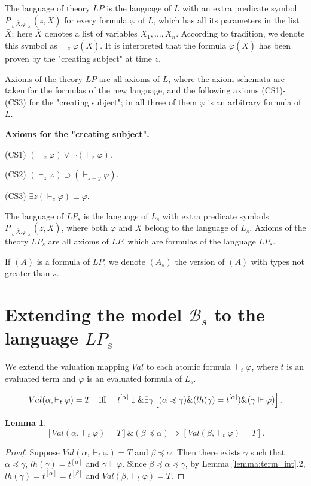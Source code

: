 \documentclass{asl}
\newtheorem{lemma}{Lemma}[section]
\theoremstyle{definition}
\begin{document}
The language of theory $ LP $ is the language of $ L $ with an extra predicate symbol $ P_{\llcorner \bar{X}.\varphi \lrcorner} (z,\bar{X})$ for every formula $ \varphi $ of $ L $, which has all its parameters in the list $ \bar{X} $; here $ \bar{X} $ denotes a list of variables $ X_1,\ldots,X_n $. According to tradition, we denote this symbol as $ \vdash_z \varphi(\bar{X}) $. It is interpreted that the formula $ \varphi(\bar{X}) $ has been proven by the "creating subject" at time $z$.

Axioms of the theory $ LP $ are all axioms of $ L $, where the axiom schemata are taken for the formulas of the new language, and the following axioms (CS1)-(CS3) for the "creating subject"; in all three of them $ \varphi $ is an arbitrary formula of $L$.
\medskip

\begin{center}
\textbf{Axioms for the "creating subject".} 
\end{center}


(CS1) $(\vdash_z \varphi)\vee \neg (\vdash_z \varphi)$. 
\medskip

(CS2) $(\vdash_z \varphi)\supset (\vdash_{z+y} \varphi)$. 
\medskip

(CS3) $\exists z (\vdash_z \varphi)\equiv \varphi $.
\medskip

The language of $ LP_s $ is the language of $ L_s $ with extra predicate symbols $P_{\llcorner \bar{X}.\varphi \lrcorner} (z,\bar{X})$, where both $ \varphi $ and $ \bar{X}$ belong to the language of $ L_s $. Axioms of the theory $ LP_s $ are all axioms of $ LP $, which are formulas of the language $ LP_s $.

If $(A)$ is a formula of $LP$, we denote $(A_s)$ the version of $(A)$ with types not greater than $s$.

\section{Extending the model $\mathcal{B}_s$ to the language $LP_s$}
We extend the valuation mapping $Val$ to each atomic formula $ \vdash _t \varphi $, where $t$ is an evaluated term and $\varphi$ is an evaluated formula of $L_s$.

\[Val(\alpha,\vdash _t \varphi)=T \textup{\quad iff \quad} 
t^{[\alpha]}\downarrow \& \exists \gamma \left[(\alpha \preccurlyeq\gamma) \& (lh(\gamma)=t^{[\alpha]}) \& (\gamma\Vdash\varphi)\right].\] 

\begin{lemma} 
\[\left[ Val(\alpha,\vdash _t \varphi)=T\right]  \& (\beta\preccurlyeq\alpha) \Rightarrow \left[ Val(\beta,\vdash _t \varphi)=T\right].\]
\label{lemma:proof_pred}
\end{lemma} 
\begin{proof}
Suppose $ Val(\alpha,\vdash _t \varphi)=T $ and $ \beta\preccurlyeq\alpha$. Then there exists $ \gamma $ such that $ \alpha\preccurlyeq \gamma$, $lh(\gamma)=t^{[\alpha]}$ and $\gamma\Vdash\varphi$.
Since $\beta\preccurlyeq \alpha \preccurlyeq\gamma$, by Lemma \ref{lemma:term_int}.2, $lh(\gamma)=t^{[\alpha]}=t^{[\beta]}$ and $ Val(\beta,\vdash _t \varphi)=T $.
\end{proof}
\end{document}

